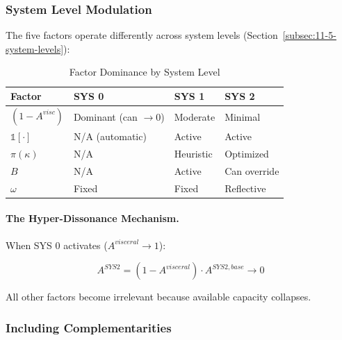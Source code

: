 \subsubsection{System Level Modulation}
\label{subsubsec:system-modulation}

The five factors operate differently across system levels 
(Section~\ref{subsec:11-5-system-levels}):

\begin{table}[htbp]
\centering
\caption{Factor Dominance by System Level}
\label{tab:system-factors}
\renewcommand{\arraystretch}{1.3}
\begin{tabular}{@{}llll@{}}
\toprule
\textbf{Factor} & \textbf{SYS 0} & \textbf{SYS 1} & \textbf{SYS 2} \\
\midrule
$(1-A^{visc})$ & Dominant (can $\to 0$) & Moderate & Minimal \\
$\mathbb{1}[\cdot]$ & N/A (automatic) & Active & Active \\
$\pi(\kappa)$ & N/A & Heuristic & Optimized \\
$B$ & N/A & Active & Can override \\
$\omega$ & Fixed & Fixed & Reflective \\
\bottomrule
\end{tabular}
\end{table}

\paragraph{The Hyper-Dissonance Mechanism.}
When SYS 0 activates ($A^{visceral} \to 1$):

\begin{equation}
A^{SYS2} = (1 - A^{visceral}) \cdot A^{SYS2,base} \to 0
\end{equation}

All other factors become irrelevant because available capacity collapses.

\subsubsection{Including Complementarities}
\label{subsubsec:complementarities}

